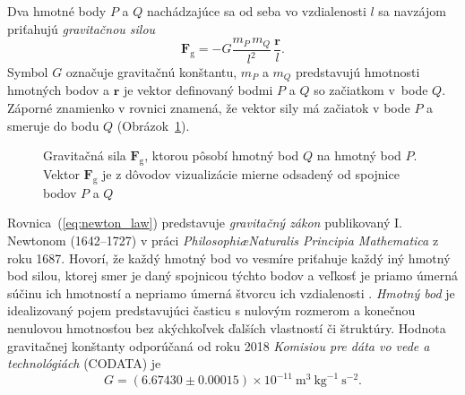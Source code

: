 \documentclass[a4paper, 12pt]{book}
\newcommand{\gidx}{\mathrm g}
\let\vec\mathbf
\begin{document}
Dva hmotné body $P$ a $Q$ nachádzajúce sa od seba vo vzdialenosti $l$ sa 
navzájom priťahujú \emph{gravitačnou silou}
%
\begin{equation}
\label{eq:newton_law}
\vec F_\gidx = -G \frac{m_P \, m_Q}{l^2} \, \frac{\vec r}{l}{.}
\end{equation}
%
Symbol $G$ označuje gravitačnú konštantu, $m_P$ a $m_Q$ predstavujú hmotnosti 
hmotných bodov a $\vec r$ je vektor definovaný bodmi $P$ a $Q$ so začiatkom 
v~bode $Q$.  Záporné znamienko v rovnici znamená, že vektor sily má začiatok 
v bode $P$ a smeruje do bodu $Q$ (Obrázok~\ref{fig:newton_law}).

\begin{figure}[b]
\centering

\caption{Gravitačná sila $\vec F_\gidx$, ktorou pôsobí hmotný bod $Q$ na hmotný 
bod $P$.  Vektor $\vec F_\gidx$ je z dôvodov vizualizácie mierne odsadený od 
spojnice bodov $P$ a $Q$}
\label{fig:newton_law}
\end{figure}

Rovnica~(\ref{eq:newton_law}) predstavuje \emph{gravitačný zákon} 
publikovaný I. Newtonom (1642--1727) v práci \emph{Philosophi\ae Naturalis 
Principia Mathematica} z roku 1687.  Hovorí, že každý hmotný bod vo vesmíre 
priťahuje každý iný hmotný bod silou, ktorej smer je daný spojnicou týchto 
bodov a veľkosť je priamo úmerná súčinu ich hmotností a nepriamo úmerná štvorcu 
ich vzdialenosti \citep{Kellogg1967}.  \emph{Hmotný bod} je idealizovaný pojem 
predstavujúci časticu s nulovým rozmerom a konečnou nenulovou hmotnosťou bez 
akýchkoľvek ďalších vlastností či štruktúry.  Hodnota gravitačnej konštanty 
odporúčaná od roku 2018 \emph{Komisiou pre dáta vo vede a technológiách} 
(CODATA) je
%
\begin{equation}
G = (6.67430 \pm 0.00015) \times 10^{-11} \ \mathrm{m}^3 \ \mathrm{kg}^{-1} 
\ \mathrm{s}^{-2}{.}
\end{equation}
\end{document}
